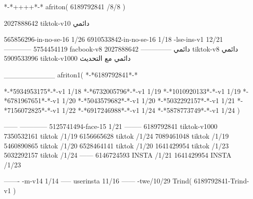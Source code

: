 *-*++++*-*
afriton(
6189792841 /8/8
)

2027888642 tiktok-v10
دائمي

565856296-in-no-se-16 1/26
6910533842-in-no-se-16 1/18
-lse-ins-v1 12/21
------------
5754454119 facbook-v8
دائمي
--------------
2027888642 tiktok-v8
دائمي
5909533996 tiktok-v1000
دائمي مع التحديث

__________
afriton1(
*-*6189792841*-*


*-*5934953175*-*-v1 1/18
*-*6732005796*-*-v1 1/19
*-*1010920133*-*-v1 1/19
*-*6781967651*-*-v1 1/20
*-*5043579682*-*-v1 1/20
*-*5032292157*-*-v1 1/21
*-*7156072825*-*-v1 1/22
*-*6917246988*-*-v1 1/24
*-*5878773749*-*-v1 1/24
)

------
------------
5125741494-face-15 1/21
--------
6189792841 tiktok-v1000
7350532161 tiktok /1/19
6156665628 tiktok /1/24
7089461048 tiktok /1/19
5460890865 tiktok /1/20
6528464141 tiktok /1/20
1641429954 tiktok /1/23
5032292157 tiktok /1/24
------
6146724593 INSTA /1/21
1641429954 INSTA /1/23

-------
-m-v14 1/14
-----
userinsta 11/16
------
-twe/10/29
Trind(
6189792841-Trind-v1 
)
